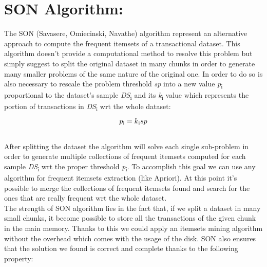 \documentclass[]{report}
\begin{document}
\section*{SON Algorithm:}   		

	The SON (Savasere, Omiecinski,
	Navathe) algorithm represent an alternative approach to compute the frequent itemsets of a transactional dataset. This algorithm doesn't provide a computational method to resolve this problem but simply suggest to split the original dataset in many chunks in order to generate many smaller problems of the same nature of the original one. In order to do so is also necessary to rescale the problem threshold \textit{sp} into a new value \textit{p}\textsubscript{i} proportional to the dataset's sample \textit{DS}\textsubscript{i} and its \textit{k}\textsubscript{i} value which represents the portion of transactions in \textit{DS}\textsubscript{i} wrt the whole dataset:
	\begin{equation}
		p\textsubscript{i} = k\textsubscript{i}sp
	\end{equation}
	 \\
	After splitting the dataset the algorithm will solve each single sub-problem in order to generate multiple collections of frequent itemsets computed for each sample \textit{DS}\textsubscript{i} wrt the proper threshold \textit{p}\textsubscript{i}. To accomplish this goal we can use any algorithm for frequent itemsets extraction (like Apriori). At this point it's possible to merge the collections of frequent itemsets found and search for the ones that are really frequent wrt the whole dataset.\\
	The strength of SON algorithm lies in the fact that, if we split a dataset in many small chunks, it become possible to store all the transactions of the given chunk in the main memory. Thanks to this we could apply an itemsets mining algorithm without the overhead which comes with the usage of the disk. SON also ensures that the solution we found is correct and complete thanks to the following property:      
	\\
	\\
\end{document}
